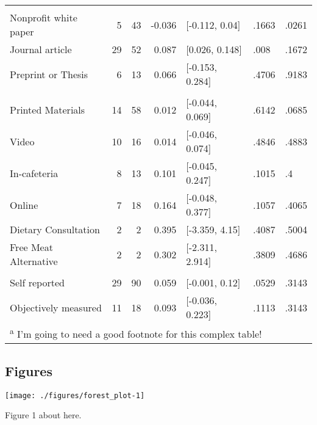 \documentclass[sn-nature,referee,pdflatex]{sn-jnl}
\begin{document}
\begin{table}
\begin{tabular}[t]{lrrrlll}
\addlinespace[0.5em]
\multicolumn{7}{l}{\textbf{Publication Status}}\\
\hspace{1em}Nonprofit white paper & 5 & 43 & -0.036 & {}[-0.112, 0.04] & .1663 & .0261\\
\hspace{1em}Journal article & 29 & 52 & 0.087 & {}[0.026, 0.148] & .008 & .1672\\
\hspace{1em}Preprint or Thesis & 6 & 13 & 0.066 & {}[-0.153, 0.284] & .4706 & .9183\\
\addlinespace[0.5em]
\multicolumn{7}{l}{\textbf{Delivery Methods}}\\
\hspace{1em}Printed Materials & 14 & 58 & 0.012 & {}[-0.044, 0.069] & .6142 & .0685\\
\hspace{1em}Video & 10 & 16 & 0.014 & {}[-0.046, 0.074] & .4846 & .4883\\
\hspace{1em}In-cafeteria & 8 & 13 & 0.101 & {}[-0.045, 0.247] & .1015 & .4\\
\hspace{1em}Online & 7 & 18 & 0.164 & {}[-0.048, 0.377] & .1057 & .4065\\
\hspace{1em}Dietary Consultation & 2 & 2 & 0.395 & {}[-3.359, 4.15] & .4087 & .5004\\
\hspace{1em}Free Meat Alternative & 2 & 2 & 0.302 & {}[-2.311, 2.914] & .3809 & .4686\\
\addlinespace[0.5em]
\multicolumn{7}{l}{\textbf{Outcome Recording}}\\
\hspace{1em}Self reported & 29 & 90 & 0.059 & {}[-0.001, 0.12] & .0529 & .3143\\
\hspace{1em}Objectively measured & 11 & 18 & 0.093 & {}[-0.036, 0.223] & .1113 & .3143\\
\bottomrule
\multicolumn{7}{l}{\textsuperscript{a} I'm going to need a good footnote for this complex table!}\\
\end{tabular}
\end{table}

\subsection{Figures}\label{figures}

\texttt{[image: ./figures/forest\_plot-1]}

Figure 1 about here.

\newpage

\renewcommand\refname{References}

\end{document}
